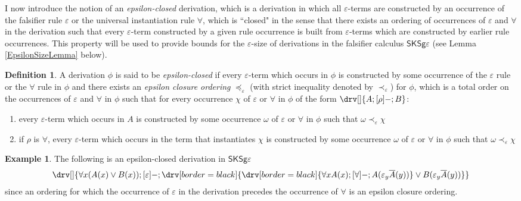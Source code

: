 \documentclass[10pt]{article}
\theoremstyle{definition}\newtheorem{remark}[theorem]{Remark}
\theoremstyle{definition}\newtheorem{example}[theorem]{Example}
\theoremstyle{definition}\newtheorem{definition}[theorem]{Definition}
\newcommand{\FalsifierCalculus}{{\mathsf{SKSg\varepsilon}}}
\newcommand{\falsifierRule}{{\mathsf{\varepsilon}}}
\begin{document}
	I now introduce the notion of an \textit{epsilon-closed} derivation, which is a derivation in which all $\varepsilon$-terms are constructed by an occurrence of the falsifier rule $\falsifierRule$ or the universal instantiation rule $\forall$, which is ``closed" in the sense that there exists an ordering of occurrences of $\falsifierRule$ and $\forall$ in the derivation such that every $\varepsilon$-term constructed by a given rule occurrence is built from $\varepsilon$-terms which are constructed by earlier rule occurrences. This property will be used to provide bounds for the $\varepsilon$-size of derivations in the falsifier calculus $\FalsifierCalculus$ (see Lemma \ref{EpsilonSizeLemma} below).
	
	\begin{definition}\label{EpsilonClosed}
		A derivation $\phi$ is said to be \textit{epsilon-closed} if every $\varepsilon$-term which occurs in $\phi$ is constructed by some occurrence of the $\falsifierRule$ rule or the $\forall$ rule in $\phi$ and there exists an \textit{epsilon closure ordering} $\preccurlyeq_\varepsilon$ (with strict inequality denoted by $\prec_\varepsilon$) for $\phi$, which is a total order on the occurrences of $\falsifierRule$ and $\forall$ in $\phi$ such that for every occurrence $\chi$ of $\falsifierRule$ or $\forall$ in $\phi$ of the form $\drv[] {A ; [\rho]- ; B}$:
		\begin{enumerate}
			\item every $\varepsilon$-term which occurs in $A$ is constructed by some occurrence $\omega$ of $\falsifierRule$ or $\forall$ in $\phi$ such that $\omega \prec_\varepsilon \chi$
			
			\item if $\rho$ is $\forall$, every $\varepsilon$-term which occurs in the term that instantiates $\chi$ is constructed by some occurrence $\omega$ of $\varepsilon$ or $\forall$ in $\phi$ such that $\omega \prec_\varepsilon \chi$
		\end{enumerate}
	\end{definition}

	\begin{example}
		The following is an epsilon-closed derivation in $\FalsifierCalculus$
		\[
			\drv[] {
				\forall x (A(x) \lor B(x)) ; [\falsifierRule]- ; \drv[border=black] {
					\drv[border=black] {
						\forall x A(x) ; [\forall]- ; A(\varepsilon_y \overline{A}(y))
					} \lor B(\varepsilon_y \overline{A}(y))
				}
			}
		\]
		since an ordering for which the occurrence of $\falsifierRule$ in the derivation precedes the occurrence of $\forall$ is an epsilon closure ordering.
	\end{example}
\end{document}

